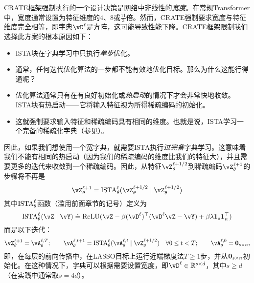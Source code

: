 \documentclass[../../book-main_zh.tex]{subfiles}
\begin{document}
CRATE框架强制执行的一个设计决策是网络中非线性的\textit{宽度}。在常规Transformer中，宽度通常设置为特征维度的\(4\)、\(8\)或\(\frac{11}{3}\)倍。然而，CRATE强制要求宽度与特征维度完全相等，即字典\(\vD^{\ell}\)是方阵，这可能导致性能下降。CRATE框架限制我们选择此方案的根本原因如下：
\begin{itemize}
    \item ISTA块在字典学习中只执行\textit{单步}优化。
    \item 通常，任何迭代优化算法的一步都不能有效地优化目标。那么为什么这能行得通呢？
    \item 优化算法通常只有在有良好初始化或\textit{热启动}的情况下才会非常快地收敛。ISTA块有热启动——它将输入特征视为所得稀疏编码的初始化。
    \item 这就强制要求输入特征和稀疏编码具有相同的维度。也就是说，ISTA学习一个完备的稀疏化字典（参见）。
\end{itemize}
因此，如果我们想使用一个宽字典，就需要ISTA执行\textit{过完备}字典学习。这意味着我们不能有相同的热启动（因为我们的稀疏编码的维度比我们的特征大），并且需要更多的迭代来收敛到一个稀疏编码。因此，从特征\(\vZ_{\theta}^{\ell + 1/2}\)到稀疏编码\(\vZ_{\theta}^{\ell + 1}\)的步骤将不再是
\begin{equation}
    \vZ_{\theta}^{\ell + 1} = \ISTA_{\theta}^{\ell}(\vZ_{\theta}^{\ell + 1/2} \mid \vZ_{\theta}^{\ell + 1/2})
\end{equation}
其中\(\operatorname{ISTA}_{\theta}^{\ell}\)函数（滥用前面章节的记号）定义为
\begin{equation}
    \ISTA_{\theta}^{\ell}(\vZ \mid \vY) \doteq \ReLU(\vZ - \beta (\vD^{\ell})^{\top}(\vD^{\ell}\vZ - \vY) + \beta \lambda \vone_{s}\vone_{n}^{\top})
\end{equation}
而是以下迭代：
\begin{equation}
    \vZ_{\theta}^{\ell + 1} = \vA_{\theta}^{\ell, T}; \qquad \vA_{\theta}^{\ell, t + 1} = \ISTA_{\theta}^{\ell}(\vA_{\theta}^{\ell, t} \mid \vZ_{\theta}^{\ell + 1/2}) \quad \forall 0 \leq t < T; \qquad \vA_{\theta}^{\ell, 0} = \vzero_{s \times n},
\end{equation}
即，在每层的前向传播中，在LASSO目标上运行近端梯度法\(T \geq 1\)步，并从\(\bm{0}_{s \times n}\)初始化。在这种情况下，字典可以根据需要设置宽度，即\(\vD^{\ell} \in \R^{s \times d}\)，其中\(s \geq d\)（在实践中通常取\(s = 4d\)）。
\end{document}
